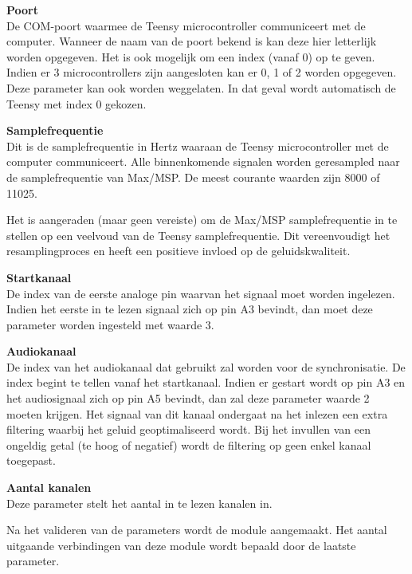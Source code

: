 \begin{description}	
	\item\textbf{Poort} \hfill \\
	De COM-poort waarmee de Teensy microcontroller communiceert met de computer. Wanneer de naam van de poort bekend is kan deze hier letterlijk worden opgegeven. Het is ook mogelijk om een index (vanaf 0) op te geven. Indien er 3 microcontrollers zijn aangesloten kan er 0, 1 of 2 worden opgegeven. Deze parameter kan ook worden weggelaten. In dat geval wordt automatisch de Teensy met index 0 gekozen.
	\item\textbf{Samplefrequentie} \hfill \\
	Dit is de samplefrequentie in Hertz waaraan de Teensy microcontroller met de computer communiceert. Alle binnenkomende signalen worden geresampled naar de samplefrequentie van Max/MSP. De meest courante waarden zijn 8000 of 11025. 
	
	Het is aangeraden (maar geen vereiste) om de Max/MSP samplefrequentie in te stellen op een veelvoud van de Teensy samplefrequentie. Dit vereenvoudigt het resamplingproces en heeft een positieve invloed op de geluidskwaliteit.
	
	\item\textbf{Startkanaal} \hfill \\
	De index van de eerste analoge pin waarvan het signaal moet worden ingelezen. Indien het eerste in te lezen signaal zich op pin A3 bevindt, dan moet deze parameter worden ingesteld met waarde 3.
	
	\item\textbf{Audiokanaal} \hfill \\
	De index van het audiokanaal dat gebruikt zal worden voor de synchronisatie. De index begint te tellen vanaf het startkanaal. Indien er gestart wordt op pin A3 en het audiosignaal zich op pin A5 bevindt, dan zal deze parameter waarde 2 moeten krijgen. Het signaal van dit kanaal ondergaat na het inlezen een extra filtering waarbij het geluid geoptimaliseerd wordt. Bij het invullen van een ongeldig getal (te hoog of negatief) wordt de filtering op geen enkel kanaal toegepast.

	\item\textbf{Aantal kanalen} \hfill \\
	Deze parameter stelt het aantal in te lezen kanalen in.
\end{description}

Na het valideren van de parameters wordt de module aangemaakt. Het aantal uitgaande verbindingen van deze module wordt bepaald door de laatste parameter.

